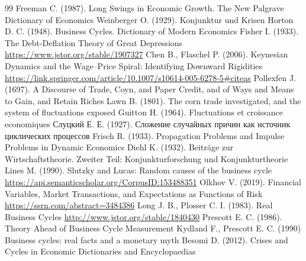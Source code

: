 \begin{RaggedRight}
\begin{thebibliography}{99}
     \hypertarget{bib:Freeman-1987}{} Freeman C. (1987). Long Swings in Economic Growth. The New Palgrave Dictionary of Economics
     \hypertarget{bib:Weinberger-1929}{} Weinberger O. (1929). Konjunktur und Krisen
     \hypertarget{bib:Horton-1948}{} Horton D. C. (1948). Business Cycles. Dictionary of Modern Economics
     \hypertarget{bib:Fisher-1933}{} Fisher I. (1933). The Debt-Deflation Theory of Great Depressions \url{https://www.jstor.org/stable/1907327}
     \hypertarget{bib:Chen-2006}{} Chen B., Flaschel P. (2006). Keynesian Dynamics and the Wage–Price Spiral: Identifying Downward Rigidities \url{https://link.springer.com/article/10.1007/s10614-005-6278-5#citeas}
     \hypertarget{bib:Pollexfen-1697}{} Pollexfen J. (1697). A Discourse of Trade, Coyn, and Paper Credit, and of Ways and Means to Gain, and Retain Riches
     \hypertarget{bib:Lawn-1801}{} Lawn B. (1801). The corn trade investigated, and the system of fluctuations exposed
     \hypertarget{bib:Guitton-1964}{} Guitton H. (1964). Fluctuations et croissance economiques
     \hypertarget{bib:Слуцкий-1927}{} Слуцкий Е. Е. (1927). Сложение случайных причин как источник циклических процессов
     \hypertarget{bib:Frisch-1933}{} Frisch R. (1933). Propagation Problems and Impulse Problems in Dynamic Economics
     \hypertarget{bib:Diehl-1932}{} Diehl K. (1932). Beiträge zur Wirtschaftstheorie. Zweiter Teil: Konjunkturforschung und Konjunkturtheorie
     \hypertarget{bib:Lines-1990}{} Lines M. (1990). Slutzky and Lucas: Random causes of the business cycle \url{https://api.semanticscholar.org/CorpusID:153488351}
     \hypertarget{bib:Olkhov-2019}{} Olkhov V. (2019). Financial Variables, Market Transactions, and Expectations as Functions of Risk \url{https://ssrn.com/abstract=3484386}
     \hypertarget{bib:Long-1983}{} Long J. B., Plosser C. I. (1983). Real Business Cycles \url{http://www.jstor.org/stable/1840430}
     \hypertarget{bib:Prescott-1986}{} Prescott E. C. (1986). Theory Ahead of Business Cycle Measurement
     \hypertarget{bib:Kydland-1990}{} Kydland F., Prescott E. C. (1990) Business cycles: real facts and a monetary myth
     \hypertarget{bib:Besomi-2012}{} Besomi D. (2012). Crises and Cycles in Economic Dictionaries and Encyclopaedias

\end{thebibliography}
\end{RaggedRight}

